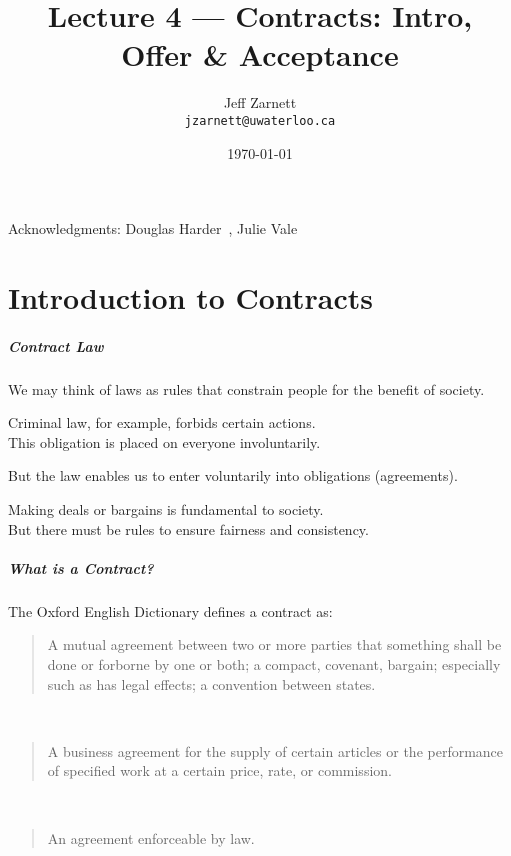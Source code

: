 

\title{Lecture 4 --- Contracts: Intro, Offer \& Acceptance }

\author{Jeff Zarnett \\ \small \texttt{jzarnett@uwaterloo.ca}}
\date{\today}




\begin{frame}
  \titlepage

\begin{center}
  \small{Acknowledgments: Douglas Harder~\cite{dwh}, Julie Vale~\cite{jv}}
  \end{center}
\end{frame}


\part{Introduction to Contracts}

\begin{frame}
\partpage
\end{frame}

\begin{frame}
\frametitle{Contract Law}

We may think of laws as rules that constrain people for the benefit of society.

Criminal law, for example, forbids certain actions.\\
\quad This obligation is placed on everyone involuntarily.

But the law enables us to enter voluntarily into obligations (agreements). 

Making deals or bargains is fundamental to society.\\
\quad But there must be rules to ensure fairness and consistency.

\end{frame}



\begin{frame}
\frametitle{What is a Contract?}

The Oxford English Dictionary defines a contract as:

\begin{quote}
	A mutual agreement between two or more parties that something shall be done or forborne by one or both; a compact, covenant, bargain; especially such as has legal effects; a convention between states.
\end{quote}~\\
\begin{quote}
	A business agreement for the supply of certain articles or the performance of specified work at a certain price, rate, or commission.
\end{quote}~\\
\begin{quote}
	An agreement enforceable by law.
\end{quote}


\end{frame}



